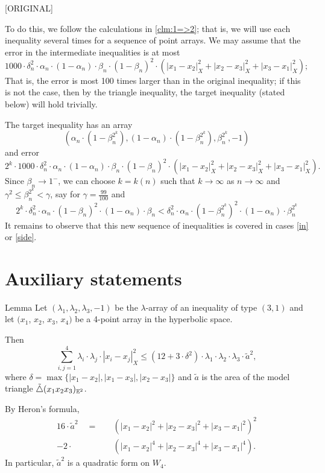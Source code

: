 \documentclass[a4paper,10pt]{article}
\begin{document}
[ORIGINAL]

To do this, we follow the calculations in \ref{clm:1=>2};
that is, we will use each inequality several times for a sequence of point arrays.
We may assume that the error in the intermediate inequalities is at most
\[1000\cdot\delta_n^2\cdot\alpha_n\cdot(1-\alpha_n)\cdot\beta_n\cdot(1-\beta_n)^2 \cdot (|x_1-x_2|_X^2+|x_2-x_3|_X^2+|x_3-x_1|_X^2);\]
That is, the error is most 100 times larger than in the original inequality; if this is not the case, then by the triangle inequality, the target inequality (stated below) will hold trivially.

The target inequality has an array
\[(\alpha_n\cdot(1-\beta_n^{2^k}),(1-\alpha_n)\cdot(1-\beta_n^{2^k}),\beta_n^{2^k},-1)
\]
and error
\[2^k\cdot1000\cdot\delta_n^2\cdot\alpha_n\cdot(1-\alpha_n)\cdot\beta_n\cdot(1-\beta_n)^2 \cdot (|x_1-x_2|_X^2+|x_2-x_3|_X^2+|x_3-x_1|_X^2).\]
Since $\beta_n\to 1^-$, we can choose $k=k(n)$ such that $k\to \infty$ as $n\to \infty$ and $\gamma^2\le \beta_n^{2^k}<\gamma$, say for $\gamma=\tfrac{99}{100}$ and
\[
2^k\cdot\delta_n^2\cdot \alpha_n\cdot(1-\beta_n)^2\cdot(1-\alpha_n)\cdot\beta_n
<
\delta_n^2\cdot \alpha_n\cdot(1-\beta_n^{2^k})^2\cdot(1-\alpha_n)\cdot\beta_n^{2^k}
\]
It remains to observe that this new sequence of inequalities is covered in cases \ref{in} or \ref{side}.
\qeds



\section{Auxiliary statements}\label{Auxiliary statements}

\begin{thm}{Lemma}\label{lem:area-bound}
Let $(\lambda_1,\lambda_2,\lambda_3,-1)$ be the $\lambda$-array of an inequality of type $(3,1)$ and
let $(x_1$, $x_2$, $x_3$, $x_4)$ be a 4-point array in the hyperbolic space.

Then
\[\sum_{i,j=1}^4\lambda_i\cdot\lambda_j\cdot|x_i-x_j|_X^2
\le
(12+3\cdot\delta^2)\cdot\lambda_1\cdot\lambda_2\cdot\lambda_3\cdot\tilde a^2,\]
where $\delta=\max\{|x_1-x_2|,|x_1-x_3|,|x_2-x_3|\}$
and
$\tilde a$ is the area of the model triangle $\tilde\triangle(x_1x_2x_3)_{\mathbb{E}^2}$.
\end{thm}

By Heron's formula,
\begin{align*}
16\cdot \tilde a^2
\quad=\quad &(|x_1-x_2|^2+|x_2-x_3|^2+|x_3-x_1|^2)^2
\\
-2\cdot &(|x_1-x_2|^4+|x_2-x_3|^4+|x_3-x_1|^4).
\end{align*}
In particular, $\tilde a^2$ is a quadratic form on $W_4$.
\end{document}
